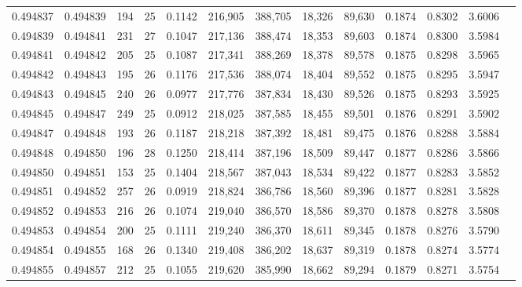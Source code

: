 \begin{tabular}{rrrrrrrrrrrrr}
0.494837 & 0.494839 & 194 &  25 &                                     0.1142 & 216,905 & 388,705 &  18,326 &  89,630 & 0.1874 & 0.8302 & 3.6006 \\
0.494839 & 0.494841 & 231 &  27 &                                     0.1047 & 217,136 & 388,474 &  18,353 &  89,603 & 0.1874 & 0.8300 & 3.5984 \\
0.494841 & 0.494842 & 205 &  25 &                                     0.1087 & 217,341 & 388,269 &  18,378 &  89,578 & 0.1875 & 0.8298 & 3.5965 \\
0.494842 & 0.494843 & 195 &  26 &                                     0.1176 & 217,536 & 388,074 &  18,404 &  89,552 & 0.1875 & 0.8295 & 3.5947 \\
0.494843 & 0.494845 & 240 &  26 &                                     0.0977 & 217,776 & 387,834 &  18,430 &  89,526 & 0.1875 & 0.8293 & 3.5925 \\
0.494845 & 0.494847 & 249 &  25 &                                     0.0912 & 218,025 & 387,585 &  18,455 &  89,501 & 0.1876 & 0.8291 & 3.5902 \\
0.494847 & 0.494848 & 193 &  26 &                                     0.1187 & 218,218 & 387,392 &  18,481 &  89,475 & 0.1876 & 0.8288 & 3.5884 \\
0.494848 & 0.494850 & 196 &  28 &                                     0.1250 & 218,414 & 387,196 &  18,509 &  89,447 & 0.1877 & 0.8286 & 3.5866 \\
0.494850 & 0.494851 & 153 &  25 &                                     0.1404 & 218,567 & 387,043 &  18,534 &  89,422 & 0.1877 & 0.8283 & 3.5852 \\
0.494851 & 0.494852 & 257 &  26 &                                     0.0919 & 218,824 & 386,786 &  18,560 &  89,396 & 0.1877 & 0.8281 & 3.5828 \\
0.494852 & 0.494853 & 216 &  26 &                                     0.1074 & 219,040 & 386,570 &  18,586 &  89,370 & 0.1878 & 0.8278 & 3.5808 \\
0.494853 & 0.494854 & 200 &  25 &                                     0.1111 & 219,240 & 386,370 &  18,611 &  89,345 & 0.1878 & 0.8276 & 3.5790 \\
0.494854 & 0.494855 & 168 &  26 &                                     0.1340 & 219,408 & 386,202 &  18,637 &  89,319 & 0.1878 & 0.8274 & 3.5774 \\
0.494855 & 0.494857 & 212 &  25 &                                     0.1055 & 219,620 & 385,990 &  18,662 &  89,294 & 0.1879 & 0.8271 & 3.5754 \\

\end{tabular}

